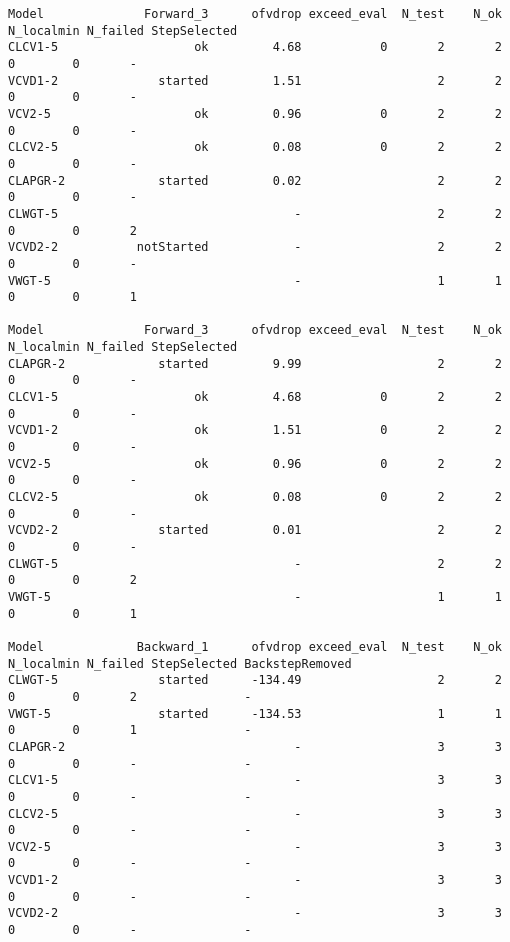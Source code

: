 {\tiny
\begin{verbatim}
Model              Forward_3      ofvdrop exceed_eval  N_test    N_ok N_localmin N_failed StepSelected
CLCV1-5                   ok         4.68           0       2       2          0        0       -
VCVD1-2              started         1.51                   2       2          0        0       -
VCV2-5                    ok         0.96           0       2       2          0        0       -
CLCV2-5                   ok         0.08           0       2       2          0        0       -
CLAPGR-2             started         0.02                   2       2          0        0       -
CLWGT-5                                 -                   2       2          0        0       2
VCVD2-2           notStarted            -                   2       2          0        0       -
VWGT-5                                  -                   1       1          0        0       1

Model              Forward_3      ofvdrop exceed_eval  N_test    N_ok N_localmin N_failed StepSelected
CLAPGR-2             started         9.99                   2       2          0        0       -
CLCV1-5                   ok         4.68           0       2       2          0        0       -
VCVD1-2                   ok         1.51           0       2       2          0        0       -
VCV2-5                    ok         0.96           0       2       2          0        0       -
CLCV2-5                   ok         0.08           0       2       2          0        0       -
VCVD2-2              started         0.01                   2       2          0        0       -
CLWGT-5                                 -                   2       2          0        0       2
VWGT-5                                  -                   1       1          0        0       1

Model             Backward_1      ofvdrop exceed_eval  N_test    N_ok N_localmin N_failed StepSelected BackstepRemoved
CLWGT-5              started      -134.49                   2       2          0        0       2               -
VWGT-5               started      -134.53                   1       1          0        0       1               -
CLAPGR-2                                -                   3       3          0        0       -               -
CLCV1-5                                 -                   3       3          0        0       -               -
CLCV2-5                                 -                   3       3          0        0       -               -
VCV2-5                                  -                   3       3          0        0       -               -
VCVD1-2                                 -                   3       3          0        0       -               -
VCVD2-2                                 -                   3       3          0        0       -               -

\end{verbatim}
}

